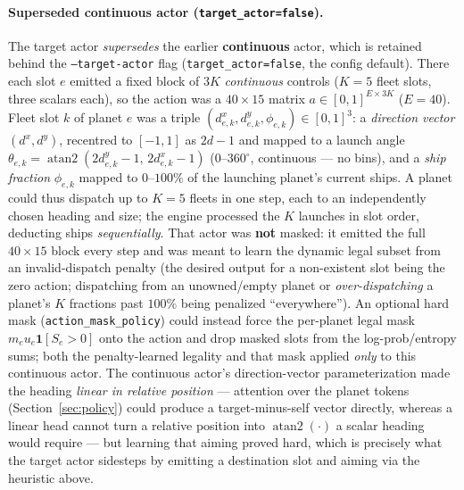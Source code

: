 \documentclass[11pt]{article}
\begin{document}
\paragraph{Superseded continuous actor (\texttt{target\_actor=false}).} The target actor
\emph{supersedes} the earlier \textbf{continuous} actor, which is retained behind the
\texttt{--target-actor} flag (\texttt{target\_actor=false}, the config default). There each slot $e$
emitted a fixed block of $3K$ \emph{continuous} controls ($K=5$ fleet slots, three scalars each), so
the action was a $40\times 15$ matrix $a\in[0,1]^{E\times 3K}$ ($E=40$). Fleet slot $k$ of planet $e$
was a triple $(d^x_{e,k},d^y_{e,k},\phi_{e,k})\in[0,1]^3$: a \emph{direction vector} $(d^x,d^y)$,
recentred to $[-1,1]$ as $2d-1$ and mapped to a launch angle
$\theta_{e,k}=\operatorname{atan2}(2d^y_{e,k}-1,\,2d^x_{e,k}-1)$ ($0$--$360^\circ$, continuous --- no
bins), and a \emph{ship fraction} $\phi_{e,k}$ mapped to $0$--$100\%$ of the launching planet's current
ships. A planet could thus dispatch up to $K=5$ fleets in one step, each to an independently chosen
heading and size; the engine processed the $K$ launches in slot order, deducting ships
\emph{sequentially}. That actor was \textbf{not} masked: it emitted the full $40\times 15$ block every
step and was meant to learn the dynamic legal subset from an invalid-dispatch penalty (the desired
output for a non-existent slot being the zero action; dispatching from an unowned/empty planet or
\emph{over-dispatching} a planet's $K$ fractions past $100\%$ being penalized ``everywhere''). An
optional hard mask (\texttt{action\_mask\_policy}) could instead force the per-planet legal mask
$m_e u_e\mathbf{1}[S_e>0]$ onto the action and drop masked slots from the log-prob/entropy sums; both
the penalty-learned legality and that mask applied \emph{only} to this continuous actor. The continuous
actor's direction-vector parameterization made the heading \emph{linear in relative position} ---
attention over the planet tokens (Section~\ref{sec:policy}) could produce a target-minus-self vector
directly, whereas a linear head cannot turn a relative position into $\operatorname{atan2}(\cdot)$ a
scalar heading would require --- but learning that aiming proved hard, which is precisely what the
target actor sidesteps by emitting a destination slot and aiming via the heuristic above.

\end{document}
